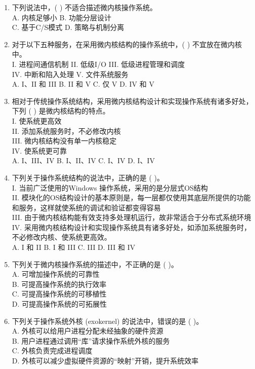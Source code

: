 \documentclass[lang=cn,newtx,10pt,scheme=chinese]{../../elegantbook}
\begin{document}
\begin{enumerate}
    \item 下列说法中，(    ) 不适合描述微内核操作系统。\\
    A. 内核足够小 \quad B. 功能分层设计\\
    C. 基于C/S模式 \quad D. 策略与机制分离

    \item 对于以下五种服务，在采用微内核结构的操作系统中，(    ) 不宜放在微内核中。\\
    I. 进程间通信机制 \quad II. 低级I/O \quad III. 低级进程管理和调度\\
    IV. 中断和陷入处理 \quad V. 文件系统服务\\
    A. I、II 和 III \quad B. II 和 V \quad C. 仅 V \quad D. IV 和 V

    \item 相对于传统操作系统结构，采用微内核结构设计和实现操作系统有诸多好处，下列 (    ) 是微内核结构的特点。\\
    I. 使系统更高效\\
    II. 添加系统服务时，不必修改内核\\
    III. 微内核结构没有单一内核稳定\\
    IV. 使系统更可靠\\
    A. I、III、IV \quad B. I、II、IV \quad C. I、IV \quad D. I、IV

    \item 下列关于操作系统结构的说法中，正确的是 (    )。\\
    I. 当前广泛使用的Windows 操作系统，采用的是分层式OS结构\\
    II. 模块化的OS结构设计的基本原则是，每一层都仅使用其底层所提供的功能和服务，这样就使系统的调试和验证都变得容易\\
    III. 由于微内核结构能有效支持多处理机运行，故非常适合于分布式系统环境\\
    IV. 采用微内核结构设计和实现操作系统具有诸多好处，如添加系统服务时，不必修改内核、使系统更高效。\\
    A. I 和 II \quad B. I 和 III \quad C. III \quad D. III 和 IV

    \item 下列关于微内核操作系统的描述中，不正确的是 (    )。\\
    A. 可增加操作系统的可靠性\\
    B. 可提高操作系统的执行效率\\
    C. 可提高操作系统的可移植性\\
    D. 可提高操作系统的可拓展性
    \item 下列关于操作系统外核 (exokernel) 的说法中，错误的是 (    )。\\
    A. 外核可以给用户进程分配未经抽象的硬件资源\\
    B. 用户进程通过调用“库”请求操作系统外核的服务\\
    C. 外核负责完成进程调度\\
    D. 外核可以减少虚拟硬件资源的“映射”开销，提升系统效率


\end{enumerate}
\end{document}
